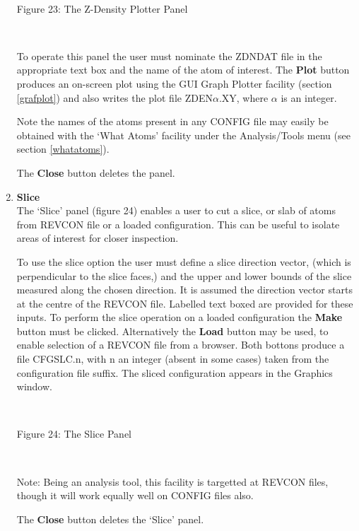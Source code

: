 \begin{enumerate}
~

\vskip 5mm
\centerline{}
\centerline{Figure 23: The Z-Density Plotter Panel}
\vskip 5mm

~

\noindent
To operate this panel the user must nominate the ZDNDAT file in the
appropriate text box and the name of the atom of interest. The {\bf
Plot} button produces an on-screen plot using the GUI Graph Plotter
facility (section \ref{grafplot}) and also writes the plot file
ZDEN$\alpha$.XY, where $\alpha$ is an integer.

Note the names of the atoms present in any CONFIG file may easily be
obtained with the `What Atoms' facility under the Analysis/Tools menu
(see section \ref{whatatoms}).

The {\bf Close} button deletes the panel.
\item {\bf Slice}\\
The `Slice' panel (figure 24) enables a user to cut a slice, or slab
of atoms from REVCON file or a loaded configuration. This can be
useful to isolate areas of interest for closer inspection.

To use the slice option the user must define a slice direction vector,
(which is perpendicular to the slice faces,) and the upper and lower
bounds of the slice measured along the chosen direction. It is assumed
the direction vector starts at the centre of the REVCON file. Labelled
text boxed are provided for these inputs.  To perform the slice
operation on a loaded configuration the {\bf Make} button must be
clicked. Alternatively the {\bf Load} button may be used, to enable
selection of a REVCON file from a browser. Both bottons produce a file
CFGSLC.n, with n an integer (absent in some cases) taken from the
configuration file suffix. The sliced configuration appears in the
Graphics window.

~

\vskip 5mm
\centerline{}
\centerline{Figure 24: The Slice Panel}
\vskip 5mm

~

\noindent
Note: Being an analysis tool, this facility is targetted at REVCON
files, though it will work equally well on CONFIG files also.

The {\bf Close} button deletes the `Slice' panel.
\end{enumerate}
